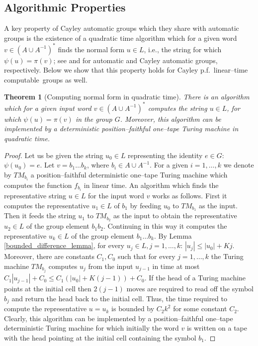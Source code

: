 \documentclass[article,12pt]{elsarticle}
\newtheorem{theorem}{Theorem}
\newcommand\linearC{Cayley p.f.~linear--time computable}
\begin{document}
\subsection{Algorithmic Properties}

A key property of Cayley automatic groups which  
they share with automatic groups is 
the existence of a quadratic time algorithm 
which for a given word $v \in
\left( A \cup A^{-1} \right)^*$ 
finds the normal form $u \in L$, i.e., the  
string for which
$\psi(u) = \pi(v)$;
see \cite[Theorem~2.3.10]{Epsteinbook} 
and \cite[Theorem~8.2]{KKM11} for 
automatic and Cayley automatic groups, 
respectively. Below we show that this 
property holds  for \linearC\ 
groups as well.    
\begin{theorem}[Computing normal form in quadratic time]
	\label{quadratic_alg_theorem1} 	
	There is an algorithm which for a given input word 
	$v \in (A \cup A^{-1})^*$ 
	computes the string $u \in  L$, 
	for which $\psi(u) = \pi (v)$ in the group $G$.
	Moreover, this algorithm can be implemented  
	by a deterministic position--faithful one--tape 
	Turing machine in quadratic time.  
\end{theorem}		
\begin{proof}    
	Let us be given   
	the string $u_0 \in L$ 
	representing the identity
	$e \in G$: $\psi(u_0)=e$. 
	Let $v = b_1 \dots b_k$, where $b_i \in A \cup A^{-1}$.
	For a given $i=1,\dots,k$ we denote by 
	$TM_{b_i}$ a position--faithful  
	deterministic one--tape Turing machine which computes 
	the function $f_{b_i}$ in linear time. %
	An algorithm which finds the representative 
	string $u \in L$ for the input word $v$ works as follows. 
	First it computes the representative $u_1 \in L$ 
	of $b_1$ by feeding $u_0$ to $TM_{b_1}$ as the input. 
	Then it feeds the string $u_1$ to  
	$TM_{b_2}$ as the input to obtain the representative 
	$u_2 \in L$ of the group element $b_1b_2$. 
	Continuing in this way it computes the  
	representative $u_k \in L$ of the group 
	element $b_1 \dots b_k$.  
	By Lemma \ref{bounded_difference_lemma}, 
	for every $u_j \in L, j =1, \dots,k$: 
	$|u_j| \leqslant  |u_{0}| + K j$.  
	Moreover, there are constants $C_1,C_0$ such that 
	for every $j =1, \dots,k$ 
	the Turing machine $TM_{b_j}$ computes 
	$u_{j}$ from the input $u_{j-1}$ in time 
	at most $C_1 |u_{j-1}|  + C_0 \leqslant 
	C_1 (|u_0|+K(j-1)) +  C_0$.       
	If the head of a Turing machine points at 
	the initial cell then $2(j-1)$ moves are required 
	to read off the symbol 
	$b_j$ and return the head back 
	to the initial cell. 
	Thus, the time required to compute the 
	representative $u = u_k$ is bounded by 
	$C_2 k^2$ for some constant $C_2$.
	Clearly, this algorithm 
	can be implemented by a  
	position--faithful one--tape deterministic 
	Turing machine for which initially 
	the word $v$ is written on a tape 
	with the head pointing at the initial cell 
	containing the symbol $b_1$.  
\end{proof}
\end{document}
